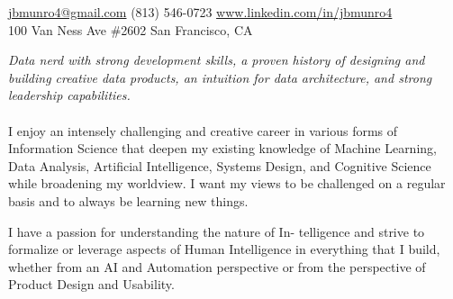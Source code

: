 \documentclass[10pt,a4paper]{article}
\begin{document}
\sloppy  %



\nobreakvspace{0.3em}  %

\noindent\href{mailto:jbmunro4.at.gmail.dot.com}{jbmunro4\mbox{}@\mbox{}gmail.com}\sbull
\textsmaller(813) 546-0723\sbull
\href{http://www.linkedin.com/in/jbmunro4}{www.linkedin.com/in/jbmunro4}
\\
100 Van Ness Ave \#2602\sbull
San Francisco, CA

\spacedhrule{0.9em}{-0.4em}  %


\vspace{-1.3em}  %
\begin{multicols}{2}  %
\noindent \emph{Data nerd with strong development skills, a proven history of designing and building creative data products, an intuition for data architecture, and strong leadership capabilities.}
\\
\\
I enjoy an intensely challenging and creative career in various forms of Information Science that deepen my existing knowledge of Machine Learning, Data Analysis, Artificial Intelligence, Systems Design, and Cognitive Science while broadening my worldview. I want my views to be challenged on a regular basis and to always be learning new things.

I have a passion for understanding the nature of In- telligence and strive to formalize or leverage aspects of Human Intelligence in everything that I build, whether from an AI and Automation perspective or from the perspective of Product Design and Usability.
\end{multicols}


\spacedhrule{0em}{-0.4em}

\end{document}
